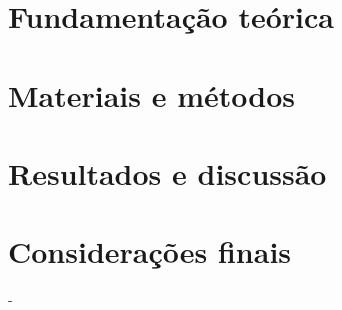 \documentclass[
	12pt,				%
	openrany,			%
	twoside,			%
	a4paper,			%
	chapter=TITLE,		%
	english,			%
	french,				%
	spanish,			%
	brazil,				%
	hyphens,
  oldfontcommands]{abntex2}
\theoremstyle{definition}
\theoremstyle{definition}
\begin{document}
\chapter{Fundamentação teórica} \label{fundteorica}




\chapter{Materiais e métodos} \label{metodologia}



\chapter{Resultados e discussão} \label{results}


% 

\chapter{Considerações finais} \label{conclusao}


-
\postextual




%
%


\begin{apendicesenv}\label{apend}

\end{apendicesenv}



%


\printindex
\end{document}
